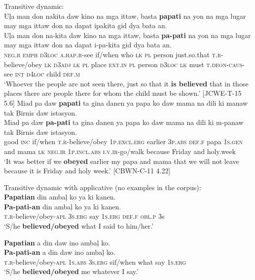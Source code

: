 \ea
\label{ex:mustbeshown}
Transitive dynamic: \\
Uļa  man  don  nakita  daw  kino  na  mga  ittaw,  basta \textbf{papati}  na  yon  na  mga  lugar  may  mga  ittaw  don na  dapat  ipakita  gid  dya  bata  an. \\\smallskip
\gll Uļa  man  don  na-kita  daw  kino  na  mga  ittaw,  basta \textbf{pa-pati}  na  yon  na  mga  lugar  may  mga  ittaw  don na  dapat  i-pa-kita  gid  dya  bata  an. \\
\textsc{neg.r}  \textsc{emph}  \textsc{d3loc}  \textsc{a.hap.r}-see  if/when  who  \textsc{lk}  \textsc{pl}  person  just.so.that
\textsc{t.r}-believe/obey  \textsc{lk}  \textsc{d3adj}  \textsc{lk}  \textsc{pl}  place  \textsc{ext.in}  \textsc{pl}  person \textsc{d3loc}
\textsc{lk}  must  \textsc{t.deon}-\textsc{caus}-see  \textsc{int}  \textsc{d4loc}  child  \textsc{def.m} \\
\glt `Whoever the people are not seen there, just so that it \textbf{is believed} that in those places there are people there for whom the child must be shown.’ [JCWE-T-15 5.6]
\z
\ea
Miad  pa  daw  \textbf{papati}  ta  gina  danen  ya  papa ko  daw  mama  na  dili  ki  manaw  tak  Birnis  daw istasyon. \\\smallskip
\gll Miad  pa  daw  \textbf{pa-pati}  ta  gina  danen  ya  papa ko  daw  mama  na  dili  ki  m-panaw  tak  Birnis  daw istasyon. \\
good  \textsc{inc}  if/when  \textsc{t.r}-believe/obey  1\textsc{p.excl.erg}  earlier  3\textsc{p.abs}  \textsc{def.f}  papa
1\textsc{s.gen}  and  mama  \textsc{lk}  \textsc{neg.ir}  1\textsc{p.incl.abs}  \textsc{i.v.ir}-go/walk  because  Friday  and
holy.week \\
\glt `It was better if we \textbf{obeyed} earlier my papa and mama that we will not leave because it is Friday and holy week.’ [CBWN-C-11 4.22]
\z

\ea
Transitive dynamic with applicative (no examples in the corpus): \\
\textbf{Papatian}  din  ambaļ  ko  ya  ki  kanen. \\\smallskip
\gll \textbf{Pa-pati-an}  din  ambaļ  ko  ya  ki  kanen. \\
\textsc{t.r}-believe/obey-\textsc{apl}  3\textsc{s.erg}  say  1\textsc{s.erg}  \textsc{def.f}  \textsc{obl.p}  3s \\
\glt ‘S/he \textbf{believed/obeyed} what I said to him/her.’
\z

\ea
\textbf{Papatian}  a  din  daw  ino  ambaļ  ko. \\\smallskip
\gll \textbf{Pa-pati-an}  a  din  daw  ino  ambaļ  ko. \\
\textsc{t.r}-believe/obey-\textsc{apl}  1\textsc{s.abs}  3\textsc{s.erg}  sif/when  what  say  1\textsc{s.erg} \\
\glt ‘S/he \textbf{believed/obeyed} me whatever I say.’
\z

